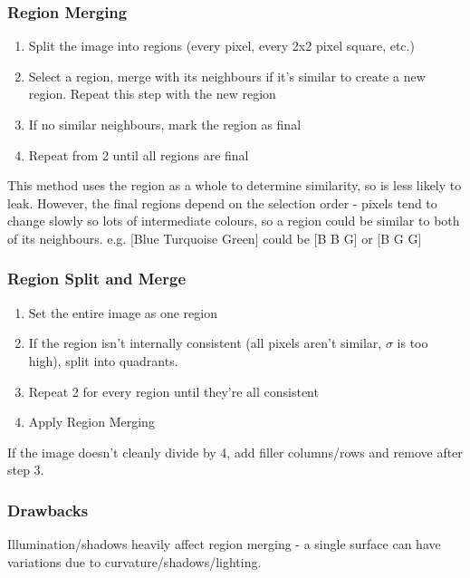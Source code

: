 \subsubsection{Region Merging}
\begin{enumerate}
    \item Split the image into regions (every pixel, every 2x2 pixel square, etc.)
    \item Select a region, merge with its neighbours if it's similar to create a new region. Repeat this step with the new region
    \item If no similar neighbours, mark the region as final 
    \item Repeat from 2 until all regions are final
\end{enumerate}
This method uses the region as a whole to determine similarity, so is less likely to leak. However, the final regions depend on the selection order - pixels tend to change slowly so lots of intermediate colours, so a region could be similar to both of its neighbours. e.g. [Blue Turquoise Green] could be [B B G] or [B G G]

\subsubsection{Region Split and Merge}
\begin{enumerate}
    \item Set the entire image as one region
    \item If the region isn't internally consistent (all pixels aren't similar, $\sigma$ is too high), split into quadrants.
    \item Repeat 2 for every region until they're all consistent
    \item Apply Region Merging
\end{enumerate}
If the image doesn't cleanly divide by 4, add filler columns/rows and remove after step 3.

\subsubsection{Drawbacks}
Illumination/shadows heavily affect region merging - a single surface can have variations due to curvature/shadows/lighting. 

